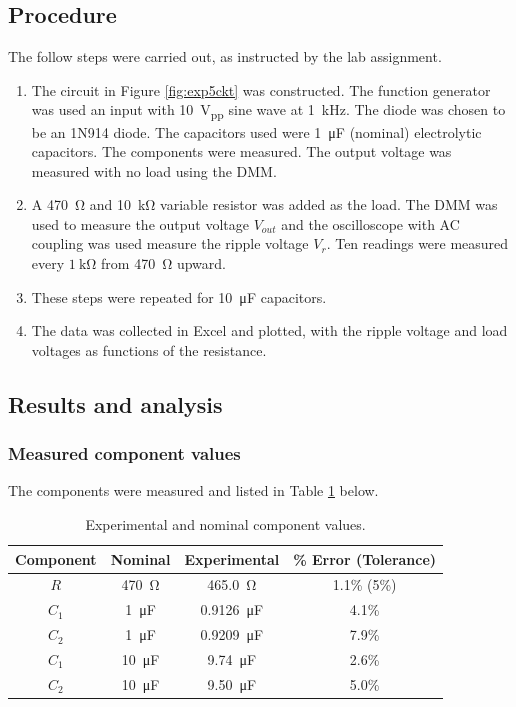 \documentclass{report}
\newcommand{\pp}{_{pp}}
\newcommand{\Vpp}{\V\pp}
\begin{document}
\subsection{Procedure}
The follow steps were carried out, as instructed by the lab assignment.
\begin{enumerate}
	\item The circuit in Figure \ref{fig:exp5ckt} was constructed. The function generator was used an input with \SI{10}{\Vpp} sine wave at \SI{1}{\kHz}. The diode was chosen to be an 1N914 diode. The capacitors used were \SI{1}{\micro\farad} (nominal) electrolytic capacitors. The components were measured. The output voltage was measured with no load using the DMM.
	\item A \SI{470}{\ohm} and \SI{10}{\kohm} variable resistor was added as the load. The DMM was used to measure the output voltage $V_{out}$ and the oscilloscope with AC coupling was used measure the ripple voltage $V_r$. Ten readings were measured every $\SI{1}{\kohm}$ from \SI{470}{\ohm} upward.
	\item These steps were repeated for \SI{10}{\micro\farad} capacitors.
	\item The data was collected in Excel and plotted, with the ripple voltage and load voltages as functions of the resistance.
\end{enumerate}

\subsection{Results and analysis}

\subsubsection{Measured component values}
The components were measured and listed in Table \ref{table:lab5components} below.
\begin{table}[h]
	\centering
	\caption{Experimental and nominal component values.}
	\label{table:lab5components}
	\begin{threeparttable}
		\begin{tabular}{cccc}
			\toprule
			Component & Nominal & Experimental & \% Error (Tolerance) \\
			\midrule
			$R$ & \SI{470}{\ohm} & \SI{465.0}{\ohm} & 1.1\% (5\%)\\
			\midrule
			$C_1$  & \SI{1}{\micro\farad} & \SI{0.9126}{\micro\farad} & 4.1\%  \\
			$C_2$  & \SI{1}{\micro\farad} & \SI{0.9209}{\micro\farad} & 7.9\%  \\
			\midrule
			$C_1$  & \SI{10}{\micro\farad} & \SI{9.74}{\micro\farad} & 2.6\%  \\
			$C_2$  & \SI{10}{\micro\farad} & \SI{9.50}{\micro\farad} & 5.0\%  \\
			\bottomrule
		\end{tabular}
	\end{threeparttable}
\end{table}
\end{document}
